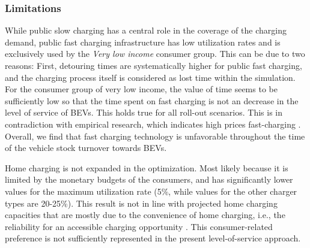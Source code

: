\documentclass[preprint,review,11pt, authoryear]{elsarticle}
\begin{document}
    

    \subsubsection{Limitations} \label{sec:lim_1}
    
    While public slow charging has a central role in the coverage of the charging demand, public fast charging infrastructure has low utilization rates and is exclusively used by the \textit{Very low income} consumer group. This can be due to two reasons: First, detouring times are systematically higher for public fast charging, and the charging process itself is considered as lost time within the simulation. For the consumer group of very low income, the value of time seems to be sufficiently low so that the time spent on fast charging is not an  decrease in the level of service of BEVs. This holds true for all roll-out scenarios. This is in contradiction with empirical research, which indicates high prices  fast-charging \cite{Lanz2022}.  Overall, we find that fast charging technology is unfavorable throughout the time of the vehicle stock turnover towards BEVs. 

    Home charging is not expanded in the optimization. Most likely because it is limited by the monetary budgets of the consumers, and has significantly lower values for the maximum utilization rate (5\%, while values for the other charger types are 20-25\%). This result is not in line with projected home charging capacities that are mostly due to the convenience of home charging, i.e., the reliability for an accessible charging opportunity \cite{STAJIC2023100658}. This consumer-related preference is not sufficiently represented in the present level-of-service approach.
         
\end{document}

